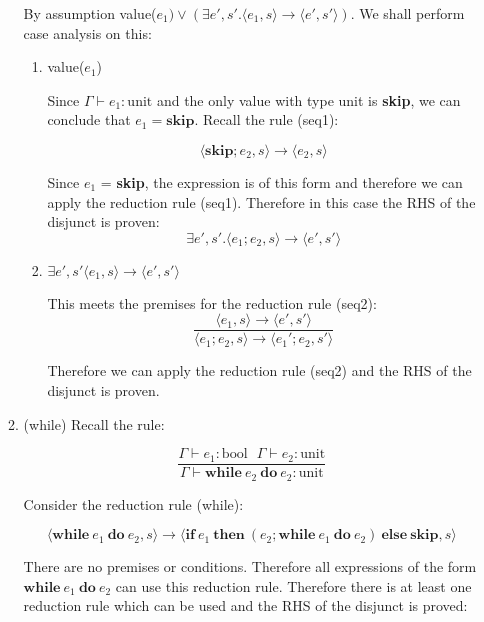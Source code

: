 \documentclass[10pt,\jkfside,a4paper]{article}
\begin{document}
\begin{enumerate}
\begin{enumerate}[label=\textbf{Case}]
By assumption value($e_1) \vee (\exists e', s'. \langle e_1, s \rangle \to
\langle e', s' \rangle)$. We shall perform case analysis on this:

\begin{enumerate}[label=\textbf{case}]

\item value($e_1$)

Since $\Gamma \vdash e_1: \text{unit}$ and the only value with type unit is
\textbf{skip}, we can conclude that $e_1 = \textbf{skip}$. Recall the rule
(seq1):

\[
\langle \textbf{skip}; e_2, s \rangle \to \langle e_2, s \rangle
\]

Since $e_1$ = \textbf{skip}, the expression is of this form and therefore we
can apply the reduction rule (seq1). Therefore in this case the RHS of the
disjunct is proven:
\[
\exists e', s'. \langle e_1; e_2, s \rangle \to \langle e', s' \rangle
\]

\item $ \exists e', s' \langle e_1, s \rangle \to \langle e', s' \rangle $

This meets the premises for the reduction rule (seq2):
\[
\dfrac{\langle e_1, s \rangle \to \langle e', s' \rangle}{ \langle e_1; e_2, s
\rangle \to \langle e_1'; e_2, s' \rangle }
\]

Therefore we can apply the reduction rule (seq2) and the RHS of the
disjunct is proven.

\end{enumerate}

\item (while) Recall the rule:

\[
\dfrac{\Gamma \vdash e_1: \text{bool} \ \ \ \Gamma \vdash e_2: \text{unit}}
{\Gamma \vdash \textbf{while} \ e_2 \ \textbf{do} \ e_2: \text{unit}}
\]

Consider the reduction rule (while):

\[
\langle \textbf{while} \ e_1 \ \textbf{do} \ e_2, s \rangle \to
\langle \textbf{if} \ e_1 \ \textbf{then} \ (e_2; \textbf{while} \ e_1 \
\textbf{do} \ e_2) \ \textbf{else} \ \textbf{skip}, s \rangle
\]

There are no premises or conditions. Therefore all expressions of the form
$\textbf{while} \ e_1 \ \textbf{do} \ e_2$ can use this reduction rule.
Therefore there is at least one reduction rule which can be used and the RHS
of the disjunct is proved:

\end{enumerate}


\end{enumerate}
\end{document}
